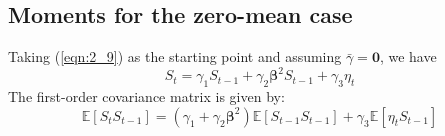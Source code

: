 \begin{appendix}
\subsection*{Moments for the zero-mean case} \label{app2}

Taking (\ref{eqn:2_9}) as the starting point and assuming $\bar{\gamma}=\pmb{0}$, we have 
\begin{equation}
S_t = \gamma_1 S_{t-1} + \gamma_2 \pmb{\beta}^2 S_{t-1} + \gamma_3 \eta_t
\label{eqn:b_6}
\end{equation}
\noindent
The first-order covariance matrix is given by: 
\begin{equation}
\mathbb{E} [S_t S_{t-1}]=(\gamma_1 + \gamma_2 \pmb{\beta}^2)\mathbb{E} [S_{t-1}S_{t-1}]+\gamma_3 \mathbb{E} [\eta_t S_{t-1}]
\label{eqn:b_7}
\end{equation}

\end{appendix}
